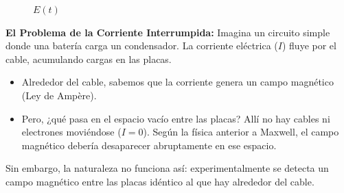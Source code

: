 \documentclass[11pt,a4paper]{book}
\begin{document}
\begin{figure}
    \caption{$E(t)$}
    \label{fig:ET}
\end{figure}


\textbf{El Problema de la Corriente Interrumpida:}
Imagina un circuito simple donde una batería carga un condensador. La corriente eléctrica ($I$) fluye por el cable, acumulando cargas en las placas.
\begin{itemize}
    \item Alrededor del cable, sabemos que la corriente genera un campo magnético (Ley de Ampère).
    \item Pero, ¿qué pasa en el espacio vacío entre las placas? Allí no hay cables ni electrones moviéndose ($I=0$). Según la física anterior a Maxwell, el campo magnético debería desaparecer abruptamente en ese espacio.
\end{itemize}
Sin embargo, la naturaleza no funciona así: experimentalmente se detecta un campo magnético entre las placas idéntico al que hay alrededor del cable.
\end{document}
